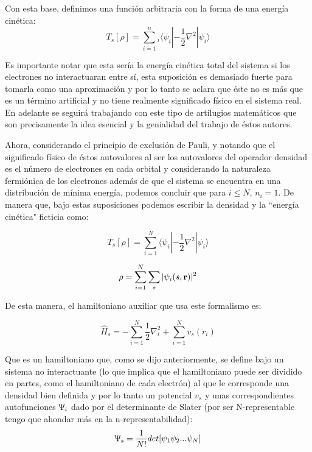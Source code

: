 \documentclass [11pt]{article}
\begin{document}
Con esta base, definimos una función arbitraria con la forma de una energía cinética:
\begin{equation}
	T_s[\rho]=\sum_{i=1}^n_i\langle\psi_i|-\frac{1}{2}\nabla^2|\psi_i\rangle
\end{equation}

Es importante notar que esta sería la energía cinética total del sistema si los electrones no interactuaran entre sí, esta suposición es demasiado fuerte para tomarla como una aproximación y por lo tanto se aclara que éste no es más que  es un término artificial y no tiene realmente significado físico en el sistema real. En adelante se seguirá trabajando con este tipo de artilugios matemáticos que son precisamente la idea esencial y la genialidad del trabajo de éstos autores.

Ahora, considerando el principio de exclusión de Pauli, y notando que el significado físico de éstos autovalores al ser los autovalores del operador densidad es el número de electrones en cada orbital y considerando la naturaleza fermiónica de los electrones además de que el sistema se encuentra en una distribución de mínima energía, podemos concluir que para $i\leq N $, $n_i=1 $. De manera que, bajo estas suposiciones podemos escribir la densidad y la ``energía cinética" ficticia como:

\begin{equation}
	T_s[\rho]=\sum_{i=1}^{N}\langle\psi_i|-\frac{1}{2}\nabla^2|\psi_i\rangle
\end{equation}
	
\begin{equation}
	\rho=\sum_{i=1}^{N}\sum_{s}^{}|\psi_i(s,{\bf r})|^2
\end{equation}

De esta manera, el hamiltoniano auxiliar que usa este formalismo es:

\begin{equation}
	\hat{H}_s=-\sum_{i=1}^{N}\frac{1}{2}\nabla_i^2+\sum_{i=1}^{N}v_s(r_i)
\end{equation}

Que es un hamiltoniano que, como se dijo anteriormente, se define bajo un sistema no interactuante (lo que implica que el hamiltoniano puede ser dividido en partes, como el hamiltoniano de cada electrón) al que le corresponde una densidad bien definida y por lo tanto un potencial $v_s$ y unas correspondientes autofunciones $\Uppsi_i$ dado por el determinante de Slater (por ser N-representable {\color{magenta} tengo que ahondar más en la n-representabilidad}):
\begin{equation}
    \Uppsi_s=\frac{1}{N!}det[\psi_1\psi_2...\psi_N]
\end{equation}
\end{document}
